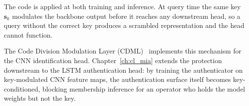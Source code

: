 The code is applied at both training and inference. At query time the same key $\mathbf{s}_k$ modulates the backbone output before it reaches any downstream head, so a query without the correct key produces a scrambled representation and the head cannot function.

The Code Division Modulation Layer (CDML)~\cite{milani2024gait} implements this mechanism for the CNN identification head. Chapter~\ref{ch:cl_mia} extends the protection downstream to the LSTM authentication head: by training the authenticator on key-modulated CNN feature maps, the authentication surface itself becomes key-conditioned, blocking membership inference for an operator who holds the model weights but not the key.
